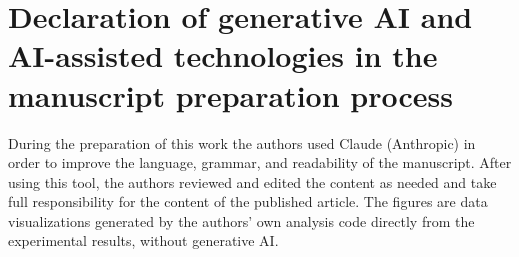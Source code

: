 \documentclass[preprint,12pt]{elsarticle}
\begin{document}
\section*{Declaration of generative AI and AI-assisted technologies in the manuscript preparation process}
During the preparation of this work the authors used Claude (Anthropic) in order to
improve the language, grammar, and readability of the manuscript. After using this
tool, the authors reviewed and edited the content as needed and take full
responsibility for the content of the published article. The figures are data
visualizations generated by the authors' own analysis code directly from the
experimental results, without generative AI.


\end{document}
